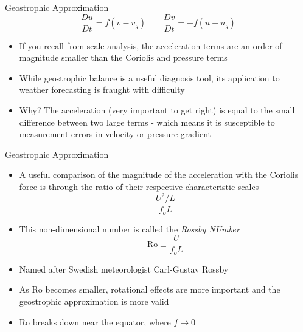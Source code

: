\begin{frame}{Geostrophic Approximation}
$$\frac{Du}{Dt} = f(v-v_g) \qquad \frac{Dv}{Dt} = -f(u-u_g)$$
\begin{itemize}
	\item If you recall from scale analysis, the acceleration terms are an order of magnitude smaller than the Coriolis and pressure terms
	\item While geostrophic balance is a useful diagnosis tool, its application to weather forecasting is fraught with difficulty
	\item Why? The acceleration (very important to get right) is equal to the small difference between two large terms - which means it is susceptible to measurement errors in velocity or pressure gradient
\end{itemize}
\end{frame}

\begin{frame}{Geostrophic Approximation}
\begin{itemize}
	\item A useful comparison of the magnitude of the acceleration with the Coriolis force is through the ratio of their respective characteristic scales
	$$\frac{U^2/L}{f_oL}$$
	\item This non-dimensional number is called the \textit{Rossby NUmber}
	$$\mathrm{Ro} \equiv \frac{U}{f_oL}$$
	\item Named after Swedish meteorologist Carl-Gustav Rossby
	\item As Ro becomes smaller, rotational effects are more important and the geostrophic approximation is more valid
	\item Ro breaks down near the equator, where $f\rightarrow0$
\end{itemize}
\end{frame}
